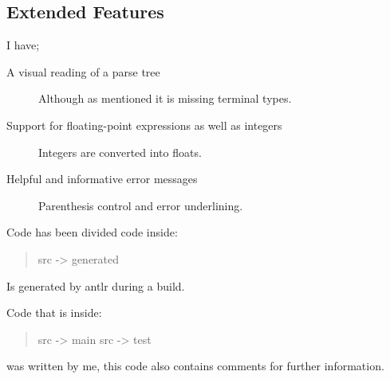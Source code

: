 \documentclass[a4paper,12pt]{article}
\begin{document}
\subsection{Extended Features}
I have;
\begin{description}
    \item[A visual reading of a parse tree] \hfill
        Although as mentioned it is missing terminal types.
    \item[Support for floating-point expressions as well as integers] \hfill
        Integers are converted into floats.
    \item[Helpful and informative error messages]
        Parenthesis control and error underlining.
\end{description}

Code has been divided code inside:
\begin{quotation}
src -> generated
\end{quotation}
Is generated by antlr during a build.


Code that is inside:
\begin{quotation}
src -> main
src -> test
\end{quotation}
was written by me, this code also contains comments for further information.
\end{document}
